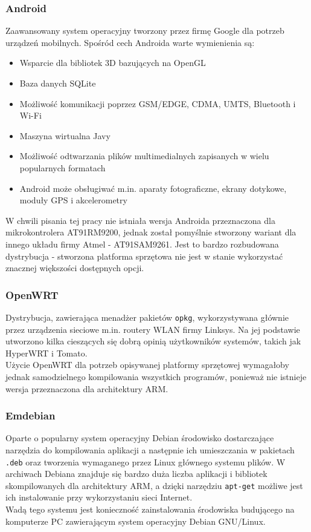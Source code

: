 \documentclass[a4paper,12pt]{book}
\begin{document}
				\subsubsection{Android}
					Zaawansowany system operacyjny tworzony przez firmę Google dla potrzeb urządzeń mobilnych. Spośród cech Androida warte wymienienia są:
					\begin{itemize}
						\item Wsparcie dla bibliotek 3D bazujących na OpenGL
						\item Baza danych SQLite
						\item Możliwość komunikacji poprzez GSM/EDGE, CDMA, UMTS, Bluetooth i Wi-Fi
						\item Maszyna wirtualna Javy
						\item Możliwość odtwarzania plików multimedialnych zapisanych w wielu popularnych formatach
						\item Android może obsługiwać m.in. aparaty fotograficzne, ekrany dotykowe, moduły GPS i akcelerometry
					\end{itemize}
					W chwili pisania tej pracy nie istniała wersja Androida przeznaczona dla mikrokontrolera AT91RM9200, jednak został pomyślnie stworzony wariant dla innego układu firmy Atmel - AT91SAM9261. Jest to bardzo rozbudowana dystrybucja - stworzona platforma sprzętowa nie jest w stanie wykorzystać znacznej większości dostępnych opcji.
				\subsubsection{OpenWRT}
					Dystrybucja, zawierająca menadżer pakietów \texttt{opkg}, wykorzystywana głównie przez urządzenia sieciowe m.in. routery WLAN firmy Linksys. Na jej podstawie utworzono kilka cieszących się dobrą opinią użytkowników systemów, takich jak HyperWRT i Tomato.\\
					Użycie OpenWRT dla potrzeb opisywanej platformy sprzętowej wymagałoby jednak samodzielnego kompilowania wszystkich programów, ponieważ nie istnieje wersja przeznaczona dla architektury ARM.
				\subsubsection{Emdebian}
					Oparte o popularny system operacyjny Debian środowisko dostarczające narzędzia do kompilowania aplikacji a następnie ich umieszczania w pakietach \texttt{.deb} oraz tworzenia wymaganego przez Linux głównego systemu plików. W archiwach Debiana znajduje się bardzo duża liczba aplikacji i bibliotek skompilowanych dla architektury ARM, a dzięki narzędziu \texttt{apt-get} możliwe jest ich instalowanie przy wykorzystaniu sieci Internet.\\
					Wadą tego systemu jest konieczność zainstalowania środowiska budującego na komputerze PC zawierającym system operacyjny Debian GNU/Linux.
\end{document}
